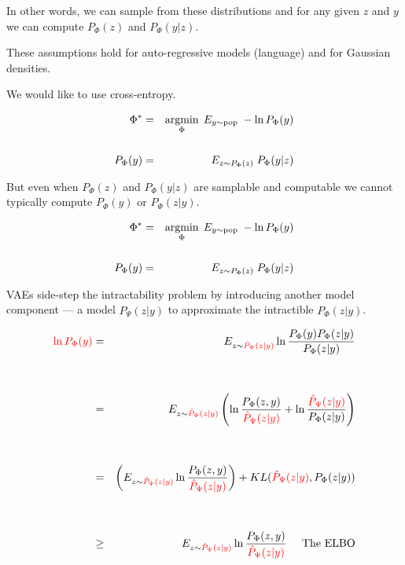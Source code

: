 {\vfill
In other words, we can sample from these distributions and for any given $z$ and $y$ we can compute $P_\Phi(z)$ and $P_\Phi(y|z)$.

\vfill
These assumptions hold for auto-regressive models (language) and for Gaussian densities.


\vfill
We would like to use cross-entropy.

\begin{eqnarray*}
\Phi^* & = & \operatorname*{argmin}_\Phi \;E_{y \sim \mathrm{pop}}\;-\ln P_\Phi(y) \\
\\
P_\Phi(y) & = & E_{z \sim P_\Phi(z)}\;P_\Phi(y|z)
\end{eqnarray*}

\vfill
But even when $P_\Phi(z)$ and $P_\Phi(y|z)$ are samplable and computable we cannot typically compute $P_\Phi(y)$ or $P_\Phi(z|y)$.


\begin{eqnarray*}
\Phi^* & = & \operatorname*{argmin}_\Phi \;E_{y \sim \mathrm{pop}}\;-\ln P_\Phi(y) \\
\\
P_\Phi(y) & = & E_{z \sim P_\Phi(z)}\;P_\Phi(y|z)
\end{eqnarray*}

\vfill
VAEs side-step the intractability problem by introducing another model component --- a model $\hat{P}_\Psi(z|y)$ to approximate the intractible $P_\Phi(z|y)$.


{\huge
\begin{eqnarray*}
 {\color{red} \ln P_\Phi(y)} & = & E_{z \sim {\color{red} \hat{P}_\Psi(z|y)}} \ln \frac{P_\Phi(y)P_\Phi(z|y)}{P_\Phi(z|y)} \\
        \\
        \\
 & = & E_{z \sim {\color{red} \hat{P}_\Psi(z|y)}} \left(\ln \frac{P_\Phi(z,y)}{{\color{red} \hat{P}_\Psi(z|y)}} + \ln \frac{{\color{red} \hat{P}_\Psi(z|y)}}{P_\Phi(z|y)}\right) \\
 \\
 \\
  & = & \left(E_{z \sim {\color{red} \hat{P}_\Psi(z|y)}} \ln \frac{P_\Phi(z,y)}{{\color{red} \hat{P}_\Psi(z|y)}}\right) + KL({\color{red} \hat{P}_\Psi(z|y)},P_\Phi(z|y)) \\
  \\
  \\
  &  \geq & E_{z \sim {\color{red} \hat{P}_\Psi(z|y)}} \ln \frac{P_\Phi(z,y)}{{\color{red} \hat{P}_\Psi(z|y)}} \;\;\;\;\;\mbox{The ELBO}
\end{eqnarray*}
}

}

